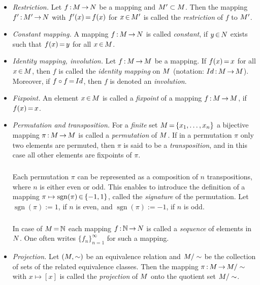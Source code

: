 \documentclass[11pt,twoside]{article}
\begin{document}
\begin{itemize}[leftmargin=15pt]
\item[5.] \textit{Restriction.}
Let $f{\,:\,}M {\,\to\,} N$ be a mapping and $M' \subset M$.
Then the mapping $f' {\,:\,} M' {\,\to\,} N$
with $f'(x) {\,=\,} f(x)$ for $x {\,\in\,} M'$ is called
the \textit{restriction} of $f$ to $M'$.

\item[6.] \textit{Constant mapping.}
A mapping $f {\,:\,} M {\,\to\,}  N$ is called \textit{constant},
if $y {\,\in\,} N$ exists such that $f(x) {\,=\,} y$ for all $x {\,\in\,} M$.

\item[7.] \textit{Identity mapping, involution.}
Let $f {\,:\,} M {\,\to\,} M$ be a mapping.
If $f(x) {\,=\,} x$ for all $x {\,\in\,} M$,
then $f$ is called the \textit{identity mapping} on $M$
(notation: $Id {\,:\,} M {\,\to\,} M$).
Moreover,
if $f \circ f {\,=\,} Id$, then $f$ is denoted an \textit{involution}.

\item[8.] \textit{Fixpoint.}
An element $x {\,\in\,} M$ is called a \textit{fixpoint}
of a mapping $f {\,:\,} M {\,\to\,} M$,
if $f(x) {\,=\,} x$.

\item[9.] \textit{Permutation and transposition.}
For a \textit{finite} set $M {\,=\,} \{x_1,\ldots,x_n\}$
a bijective mapping $\pi {\,:\,} M {\,\to\,} M$
is called a \textit{permutation} of $M$.
If in a permutation $\pi$ only two elements are permuted,
then $\pi$ is said to be a \textit{transposition},
and in this case all other elements are fixpoints of $\pi$.

\subparagraph{}
Each permutation $\pi$ can be represented as a composition
of $n$ transpositions,
where $n$ is either even or odd.
This enables to introduce the definition of a mapping
$\pi \mapsto \operatorname{sgn}(\pi) {\,\in\,} \{-1,1\}$,
called the \textit{signature} of the permutation.
Let $\operatorname{sgn}(\pi) := 1$, if $n$ is even,
and $\operatorname{sgn}(\pi) := -1$, if $n$ is odd.

\subparagraph{}
In case of $M {\,=\,} {\mathbb{N}}$ each mapping $f {\,:\,} {\mathbb{N}} {\,\to\,} N$
is called a \textit{sequence} of elements in $N$.
One often writes $\{f_n\}_{n=1}^{\infty}$ for such a mapping.

\item[10.] \textit{Projection.}
Let $(M,\sim)$ be an equivalence relation and $M / \sim$ be
the collection of sets of the related equivalence classes.
Then the mapping $\pi {\,:\,} M {\,\to\,} M / \sim$ with $x \mapsto [x]$
is called the \textit{projection} of $M$
onto the quotient set $M / \sim$.


\end{itemize}
\end{document}
